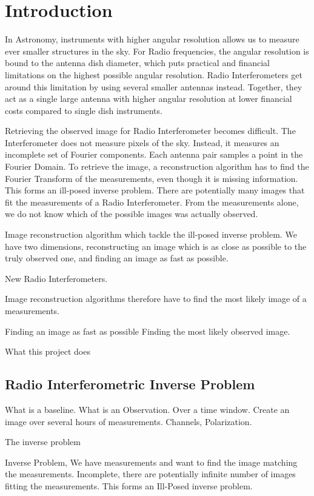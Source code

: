 \section{Introduction}\label{intro}
In Astronomy, instruments with higher angular resolution allows us to measure ever smaller structures in the sky. For Radio frequencies, the angular resolution is bound to the antenna dish diameter, which puts practical and financial limitations on the highest possible angular resolution. Radio Interferometers get around this limitation by using several smaller antennas instead. Together, they act as a single large antenna with higher angular resolution at lower financial costs compared to single dish instruments.

Retrieving the observed image for Radio Interferometer becomes difficult. The Interferometer does not measure pixels of the sky. Instead, it measures an incomplete set of Fourier components. Each antenna pair samples a point in the Fourier Domain. To retrieve the image, a reconstruction algorithm has to find the Fourier Transform of the measurements, even though it is missing information. This forms an ill-posed inverse problem. There are potentially many images that fit the measurements of a Radio Interferometer. From the measurements alone, we do not know which of the possible images was actually observed.

Image reconstruction algorithm which tackle the ill-posed inverse problem. We have two dimensions, reconstructing an image which is as close as possible to the truly observed one, and finding an image as fast as possible.

New Radio Interferometers.

Image reconstruction algorithms therefore have to find the most likely image of a measurements.

Finding an image as fast as possible
Finding the most likely observed image.

What this project does


\subsection{Radio Interferometric Inverse Problem}
What is a baseline.
What is an Observation. Over a time window. Create an image over several hours of measurements.
Channels, Polarization.

The inverse problem

Inverse Problem, We have measurements and want to find the image matching the measurements. Incomplete, there are potentially infinite number of images fitting the measurements. This forms an Ill-Posed inverse problem. 

